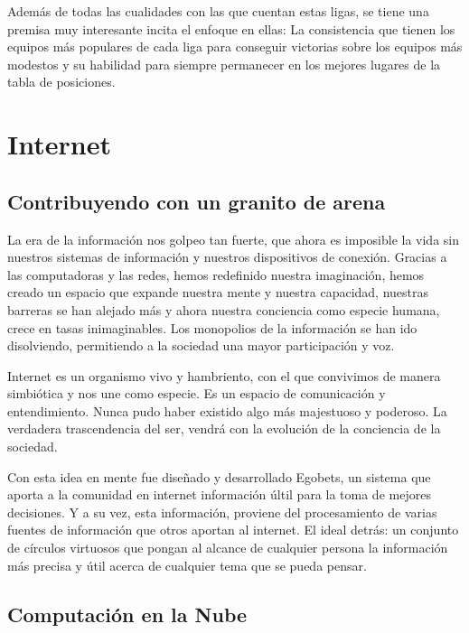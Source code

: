 Además de todas las cualidades con las que cuentan estas ligas, se tiene una premisa muy interesante incita el enfoque en ellas: La consistencia que tienen los equipos más populares de cada liga para conseguir victorias sobre los equipos más modestos y su habilidad para siempre permanecer en los mejores lugares de la tabla de posiciones. 

\section{Internet}
\subsection{Contribuyendo con un granito de arena}
La era de la información nos golpeo tan fuerte, que ahora es imposible la vida sin nuestros sistemas de información y nuestros dispositivos de conexión. Gracias a las computadoras y las redes, hemos redefinido nuestra imaginación, hemos creado un espacio que expande nuestra mente y nuestra capacidad, nuestras barreras se han alejado más y ahora nuestra conciencia como especie humana, crece en tasas inimaginables. Los monopolios de la información se han ido disolviendo, permitiendo a la sociedad una mayor participación y voz.

Internet es un organismo vivo y hambriento, con el que convivimos de manera simbiótica y nos une como especie. Es un espacio de comunicación y entendimiento. Nunca pudo haber existido algo más majestuoso y poderoso. La verdadera trascendencia del ser, vendrá con la evolución de la conciencia de la sociedad.

Con esta idea en mente fue diseñado y desarrollado Egobets, un sistema que aporta a la comunidad en internet información últil para la toma de mejores decisiones. Y a su vez, esta información, proviene del procesamiento de varias fuentes de información que otros aportan al internet. El ideal detrás: un conjunto de círculos virtuosos que pongan al alcance de cualquier persona la información más precisa y útil acerca de cualquier tema que se pueda pensar.

\subsection{Computación en la Nube}

